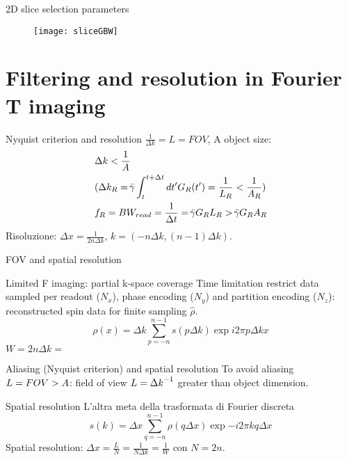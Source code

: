 \begin{wordonframe}{2D slice selection parameters}
\begin{figure}[!ht]\texttt{[image: sliceGBW]}\label{fig:sliceGBW}\end{figure}
\end{wordonframe}

\section{Filtering and resolution in Fourier T imaging}

\begin{frame}{Nyquist criterion and resolution}
$\frac{1}{\Delta k}=L=FOV$, A object size:
\begin{align*}
&\Delta k<\frac{1}{A}\\
&(\Delta k_R=\gammabar\int_t^{t+\Delta t}d t'G_R(t')=\frac{1}{L_R}<\frac{1}{A_R})\\
&f_R=BW_{read}=\frac{1}{\Delta t}=\gammabar G_RL_R>\gammabar G_RA_R
\end{align*}
Risoluzione: $\Delta x=\frac{1}{2n\Delta k}$, $k=(-n\Delta k,(n-1)\Delta k)$.
\end{frame}

\begin{frame}{FOV and spatial resolution}
    \begin{block}{Limited F imaging: partial k-space coverage}
    Time limitation restrict data sampled per readout ($N_x$), phase encoding ($N_y$) and partition encoding ($N_z$): reconstructed spin data for finite sampling $\hat{\rho}$.
    \begin{equation*}
        \rho(x)=\Delta k\sum_{p=-n}^{n-1}s(p\Delta k)\exp{i2\pi p\Delta kx}
    \end{equation*}
    $W=2n\Delta k=$
    \end{block}
    \begin{block}{Aliasing (Nyquist criterion) and spatial resolution}
    To avoid aliasing $L=FOV{}>A$: field of view $L={\Delta k}^{-1}$ greater than object dimension.
    \end{block}
\begin{block}{Spatial resolution}
L'altra meta della trasformata di Fourier discreta
\begin{equation*}
s(k)=\Delta x\sum_{q=-n}^{n-1}\rho(q\Delta x)\exp{-i2\pi kq\Delta x}
\end{equation*}
Spatial resolution: $\Delta x=\frac{L}{N}=\frac{1}{N\Delta k}=\frac{1}{W}$ con $N=2n$.
\end{block}
\end{frame}

